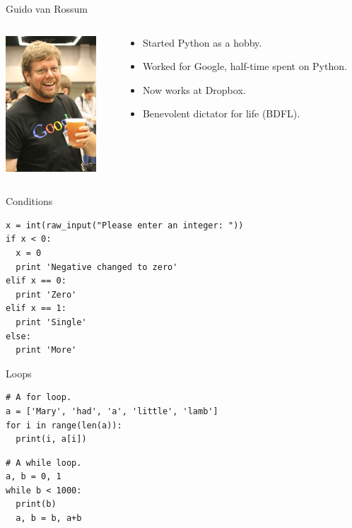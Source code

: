 \begin{frame}{Guido van Rossum}
  \begin{columns}
    \begin{column}{0.2\textwidth}
      \includegraphics[height=2in]{img/guido_van_rossum.jpg}
    \end{column}
    \begin{column}{0.6\textwidth}
      \begin{itemize}
        \item Started Python as a hobby.
        \vspace{0.25cm}
        \item Worked for Google, half-time spent on Python.
        \vspace{0.25cm}
        \item Now works at Dropbox.
        \vspace{0.25cm}
        \item Benevolent dictator for life (BDFL).
      \end{itemize}
    \end{column}
  \end{columns}
\end{frame}

\begin{frame}[fragile]{Conditions}
  \begin{verbatim}
x = int(raw_input("Please enter an integer: "))
if x < 0:
  x = 0
  print 'Negative changed to zero'
elif x == 0:
  print 'Zero'
elif x == 1:
  print 'Single'
else:
  print 'More'
  \end{verbatim}
\end{frame}

\begin{frame}[fragile]{Loops}
  \begin{verbatim}
# A for loop.
a = ['Mary', 'had', 'a', 'little', 'lamb']
for i in range(len(a)):
  print(i, a[i])
  \end{verbatim}
  \begin{verbatim}
# A while loop.
a, b = 0, 1
while b < 1000:
  print(b)
  a, b = b, a+b
  \end{verbatim}
\end{frame}

